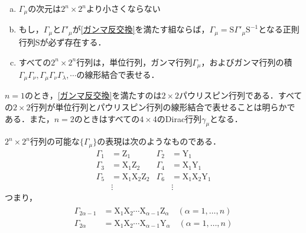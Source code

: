 \documentclass[a4paper,11pt]{jsreport}
\begin{document}
\begin{enumerate}[(a)]
  \item $\Gamma_{\mu}$の次元は$2^n \times 2^n$より小さくならない
  \item もし，$\Gamma_{\mu}$と$\Gamma'_{\mu}$が\ref{ガンマ反交換}を満たす組ならば，$\Gamma_{\mu} = \mathrm{S} \Gamma'_{\mu} \mathrm{S}^{-1}$となる正則行列$\mathrm{S}$が必ず存在する．
  \item すべての$2^n \times 2^n$行列は，単位行列，ガンマ行列$\Gamma_{\mu}$，およびガンマ行列の積$\Gamma_{\mu} \Gamma_{\nu}, \Gamma_{\mu} \Gamma_{\nu} \Gamma_{\lambda}, \cdots$の線形結合で表せる．
\end{enumerate}
$n=1$のとき，\ref{ガンマ反交換}を満たすのは$2 \times 2$パウリスピン行列である．すべての$2 \times 2$行列が単位行列とパウリスピン行列の線形結合で表せることは明らかである．また，$n=2$のときはすべての$4 \times 4$のDirac行列$\gamma_{\mu}$となる．\par
$2^n \times 2^n$行列の可能な$\{\Gamma_{\mu}\}$の表現は次のようなものである．
\begin{align*}
  \Gamma_1 &= \mathrm{Z}_1 & \Gamma_2 &= \mathrm{Y}_1 \\
  \Gamma_3 &= \mathrm{X}_1 \mathrm{Z}_2 & \Gamma_4 &= \mathrm{X}_1 \mathrm{Y}_1 \\
  \Gamma_5 &= \mathrm{X}_1 \mathrm{X}_2 \mathrm{Z}_2 & \Gamma_6 &= \mathrm{X}_1 \mathrm{X}_2 \mathrm{Y}_1 \\
  &\vdots & &\vdots
\end{align*}
つまり，
\begin{align}
  \begin{split}
    \Gamma_{2\alpha-1} &= \mathrm{X}_1 \mathrm{X}_2 \cdots \mathrm{X}_{\alpha-1} \mathrm{Z}_{\alpha} \quad (\alpha=1,\dots,n) \\
    \Gamma_{2\alpha} &= \mathrm{X}_1 \mathrm{X}_2 \cdots \mathrm{X}_{\alpha-1} \mathrm{Y}_{\alpha} \quad (\alpha=1,\dots,n)
  \end{split}
\end{align}
\end{document}
